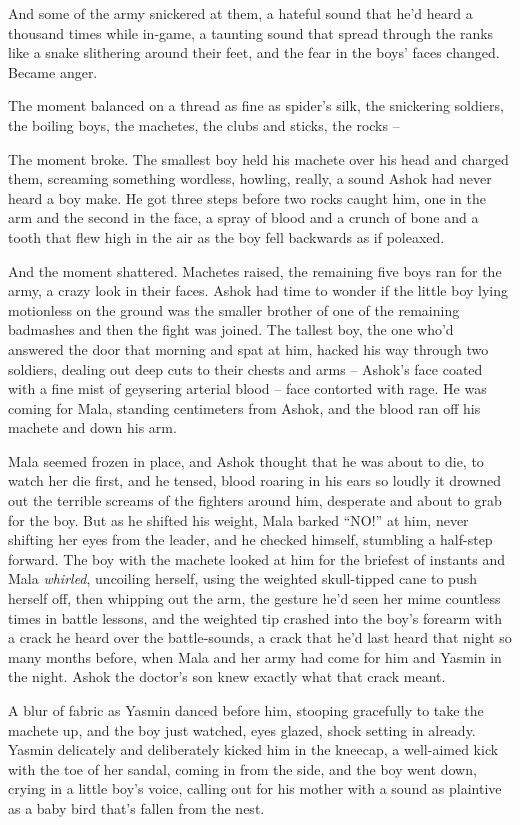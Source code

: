 And some of the army snickered at them, a hateful sound that he'd
heard a thousand times while in-game, a taunting sound that spread
through the ranks like a snake slithering around their feet, and
the fear in the boys' faces changed. Became anger.

The moment balanced on a thread as fine as spider's silk, the
snickering soldiers, the boiling boys, the machetes, the clubs and
sticks, the rocks --

The moment broke. The smallest boy held his machete over his head
and charged them, screaming something wordless, howling, really, a
sound Ashok had never heard a boy make. He got three steps before
two rocks caught him, one in the arm and the second in the face, a
spray of blood and a crunch of bone and a tooth that flew high in
the air as the boy fell backwards as if poleaxed.

And the moment shattered. Machetes raised, the remaining five boys
ran for the army, a crazy look in their faces. Ashok had time to
wonder if the little boy lying motionless on the ground was the
smaller brother of one of the remaining badmashes and then the
fight was joined. The tallest boy, the one who'd answered the door
that morning and spat at him, hacked his way through two soldiers,
dealing out deep cuts to their chests and arms -- Ashok's face
coated with a fine mist of geysering arterial blood -- face
contorted with rage. He was coming for Mala, standing centimeters
from Ashok, and the blood ran off his machete and down his arm.

Mala seemed frozen in place, and Ashok thought that he was about to
die, to watch her die first, and he tensed, blood roaring in his
ears so loudly it drowned out the terrible screams of the fighters
around him, desperate and about to grab for the boy. But as he
shifted his weight, Mala barked ``NO!'' at him, never shifting her
eyes from the leader, and he checked himself, stumbling a half-step
forward. The boy with the machete looked at him for the briefest of
instants and Mala \emph{whirled}, uncoiling herself, using the
weighted skull-tipped cane to push herself off, then whipping out
the arm, the gesture he'd seen her mime countless times in battle
lessons, and the weighted tip crashed into the boy's forearm with a
crack he heard over the battle-sounds, a crack that he'd last heard
that night so many months before, when Mala and her army had come
for him and Yasmin in the night. Ashok the doctor's son knew
exactly what that crack meant.

A blur of fabric as Yasmin danced before him, stooping gracefully
to take the machete up, and the boy just watched, eyes glazed,
shock setting in already. Yasmin delicately and deliberately kicked
him in the kneecap, a well-aimed kick with the toe of her sandal,
coming in from the side, and the boy went down, crying in a little
boy's voice, calling out for his mother with a sound as plaintive
as a baby bird that's fallen from the nest.

